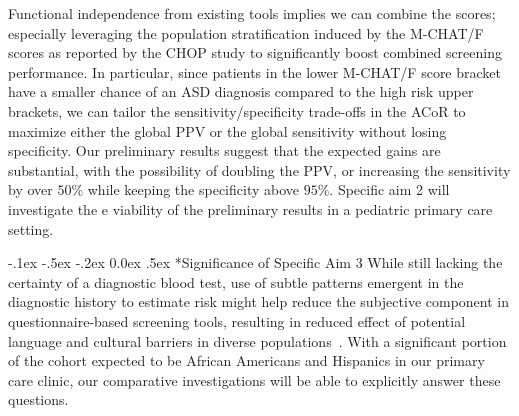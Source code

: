 \documentclass[onecolumn, compsoc,11pt]{IEEEtran}
\makeatletter
\renewcommand\paragraph{\@startsection {section}{1}{\z@}%
                                   {-.1ex \@plus -.5ex \@minus -.2ex}%
                                   {0.0ex \@plus.5ex}%
                                   {\fontsize{11}{10}\selectfont\bfseries\itshape\sffamily\color{black}}}
\def\ZERO{ACoR\xspace}
\makeatother
\begin{document}
Functional independence from existing tools implies  we can   combine the scores; especially leveraging the population stratification induced by the M-CHAT/F scores as reported by the CHOP study to significantly boost combined screening performance. In particular, since patients in the lower M-CHAT/F score bracket have a smaller chance of an ASD diagnosis compared to the high risk upper brackets, we can tailor the sensitivity/specificity trade-offs in the \ZERO to maximize  either the global PPV or the global sensitivity without losing specificity. Our preliminary results suggest that the expected gains are substantial, with the possibility of doubling the PPV, or increasing the sensitivity by over $50\%$ while keeping the specificity above $95\%$. Specific aim 2 will investigate the e viability of the preliminary results in a pediatric primary care setting.

\paragraph*{Significance of Specific Aim 3} While still lacking the certainty of a diagnostic blood test,  use of subtle patterns emergent in  the diagnostic history to estimate risk might help reduce the subjective component in questionnaire-based screening tools, resulting in reduced effect of potential language and cultural barriers in diverse populations~\cite{hyman2020identification}. With a significant portion of the  cohort expected to be African Americans and Hispanics in our primary care clinic, our comparative investigations will be able to explicitly answer these questions.
\end{document}
